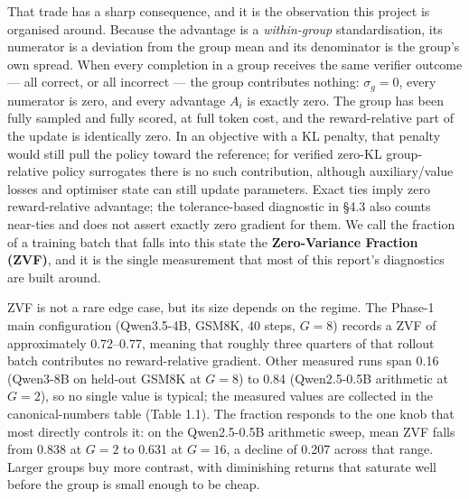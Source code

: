 \documentclass[12pt,a4paper]{report}
\begin{document}
That trade has a sharp consequence, and it is the observation this
project is organised around. Because the advantage is a
\emph{within-group} standardisation, its numerator is a deviation from
the group mean and its denominator is the group's own spread. When every
completion in a group receives the same verifier outcome --- all
correct, or all incorrect --- the group contributes nothing:
\(\sigma_g = 0\), every numerator is zero, and every advantage \(A_i\)
is exactly zero. The group has been fully sampled and fully scored, at
full token cost, and the reward-relative part of the update is
identically zero. In an objective with a KL penalty, that penalty would
still pull the policy toward the reference; for verified zero-KL
group-relative policy surrogates there is no such contribution, although
auxiliary/value losses and optimiser state can still update parameters.
Exact ties imply zero reward-relative advantage; the tolerance-based
diagnostic in §4.3 also counts near-ties and does not assert exactly
zero gradient for them. We call the fraction of a training batch that
falls into this state the \textbf{Zero-Variance Fraction (ZVF)}, and it
is the single measurement that most of this report's diagnostics are
built around.

ZVF is not a rare edge case, but its size depends on the regime. The
Phase-1 main configuration (Qwen3.5-4B, GSM8K, 40 steps, \(G = 8\))
records a ZVF of approximately 0.72--0.77, meaning that roughly three
quarters of that rollout batch contributes no reward-relative gradient.
Other measured runs span 0.16 (Qwen3-8B on held-out GSM8K at \(G = 8\))
to 0.84 (Qwen2.5-0.5B arithmetic at \(G = 2\)), so no single value is
typical; the measured values are collected in the canonical-numbers
table (Table 1.1). The fraction responds to the one knob that most
directly controls it: on the Qwen2.5-0.5B arithmetic sweep, mean ZVF
falls from 0.838 at \(G = 2\) to 0.631 at \(G = 16\), a decline of 0.207
across that range. Larger groups buy more contrast, with diminishing
returns that saturate well before the group is small enough to be cheap.
\end{document}
